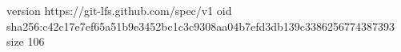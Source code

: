 version https://git-lfs.github.com/spec/v1
oid sha256:c42c17e7ef65a51b9e3452bc1c3c9308aa04b7efd3db139c3386256774387393
size 106
